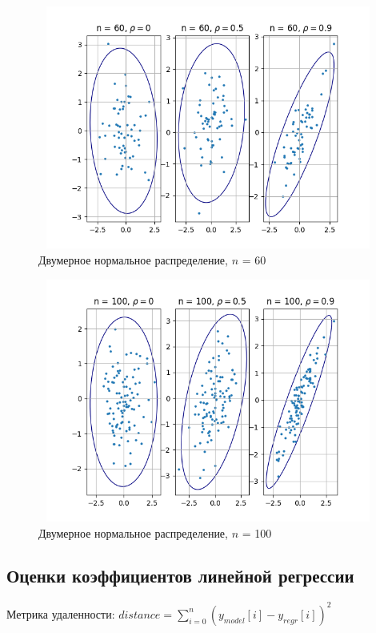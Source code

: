 \begin{figure}[H]
	\centering
	\includegraphics[width = 13cm, height = 8cm]{resources/5_60.png}
	\caption{Двумерное нормальное распределение, $n$ = 60}
	\label{fig:n60}
\end{figure}

\begin{figure}[H]
	\centering
	\includegraphics[width = 13cm, height = 8cm]{resources/5_100.png}
	\caption{Двумерное нормальное распределение, $n$ = 100}
	\label{fig:n100}
\end{figure}
\subsection{Оценки коэффициентов линейной регрессии}

\noindent Метрика удаленности: $distance = \sum_{i=0}^{n}(y_{model}[i]-y_{regr}[i])^2$
